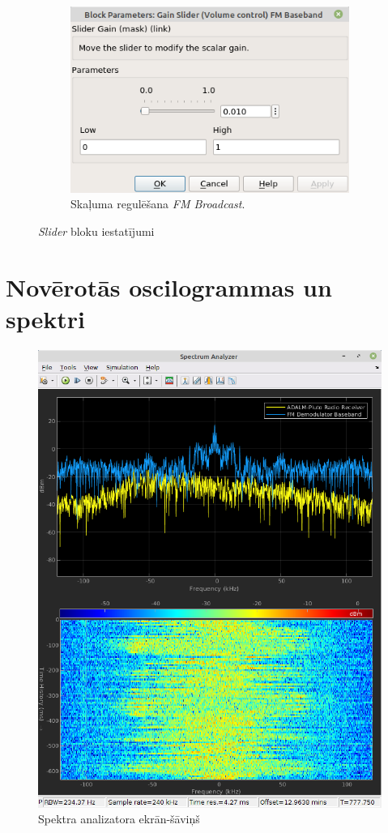 \documentclass[a4paper,12pt]{extarticle}    %
\begin{document}
\begin{figure}[H]
\begin{subfigure}[t]{0.45\textwidth}
		\includegraphics[trim={0cm 0cm 0cm 0cm},clip, angle=0, width=0.99\linewidth ]{pictures/gain2.png}
		\caption{Skaļuma regulēšana \textit{FM Broadcast}.}\label{fig:volume2}
	\end{subfigure}
	\caption{\textit{Slider} bloku iestatījumi}
	\label{fig:sliders}
\end{figure} 
\section{Novērotās oscilogrammas un spektri}
%
\begin{figure}[H]
  	 \centering
  		\includegraphics[trim={0cm 0cm 0cm 0cm},clip, angle=0, width=0.5\linewidth ]{pictures/spectrum_analyzer.png}
  		\caption{Spektra analizatora ekrān-šāviņš}\label{fig:spectrum_analyzer}
\end{figure}
%
\end{document}
